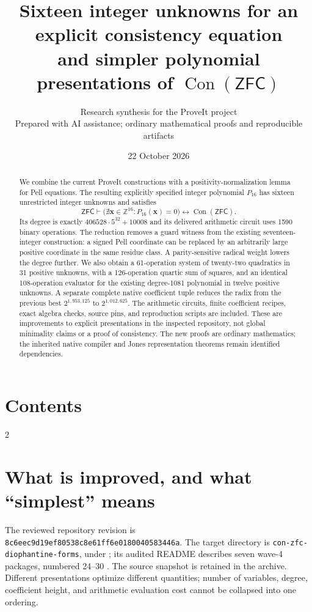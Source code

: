 \documentclass[11pt]{article}
\title{Sixteen integer unknowns for an explicit consistency equation\\[5pt]\large and simpler polynomial presentations of $\operatorname{Con}(\mathsf{ZFC})$}
\author{Research synthesis for the ProveIt project\\\small Prepared with AI assistance; ordinary mathematical proofs and reproducible artifacts}
\date{22 October 2026}
\theoremstyle{remark}\newtheorem{remark}[theorem]{Remark}
\newcommand{\Z}{\mathbb Z}\newcommand{\N}{\mathbb N}
\newcommand{\ZFC}{\mathsf{ZFC}}\newcommand{\Con}{\operatorname{Con}(\ZFC)}
\newcommand{\SignedOps}{1590}
\newcommand{\pin}{\texttt{8c6eec9d19ef80538c8e61ff6e0180040583446a}}
\begin{document}
\maketitle
\begin{abstract}
We combine the current ProveIt constructions with a positivity-normalization
lemma for Pell equations. The resulting explicitly specified integer polynomial
$P_{16}$ has sixteen unrestricted integer unknowns and satisfies
\[
 \ZFC\vdash\bigl(\nexists\mathbf x\in\Z^{16}:P_{16}(\mathbf x)=0\bigr)
 \longleftrightarrow\Con.
\]
Its degree is exactly $406528\cdot5^{32}+10008$ and its delivered arithmetic
circuit uses \SignedOps{} binary operations. The reduction removes a guard
witness from the existing seventeen-integer construction: a signed Pell
coordinate can be replaced by an arbitrarily large positive coordinate in
the same residue class. A parity-sensitive radical weight lowers the degree
further. We also obtain a 61-operation system of twenty-two quadratics in
31 positive unknowns, with a 126-operation quartic sum of squares, and an
identical 108-operation evaluator for the existing degree-1081 polynomial
in twelve positive unknowns. A separate complete native coefficient tuple
reduces the radix from the previous best $2^{1,953,125}$ to $2^{1,012,625}$.
The arithmetic circuits, finite coefficient
recipes, exact algebra checks, source pins, and reproduction scripts are
included. These are improvements to explicit presentations in the inspected
repository, not global minimality claims or a proof of consistency. The new
proofs are ordinary mathematics; the inherited native compiler and Jones
representation theorems remain identified dependencies.
\end{abstract}
\section*{Contents}
\setcounter{tocdepth}{1}
\begin{multicols}{2}\small
\makeatletter{}\makeatother
\end{multicols}
\newpage

\section{What is improved, and what ``simplest'' means}
The reviewed repository revision is \pin. The target directory is
\texttt{con-zfc-diophantine-forms}, under
; its audited
README describes seven wave-4 packages, numbered 24--30 \cite{repo}.
The source snapshot is retained in the archive. Different presentations
optimize different quantities; number of variables, degree, coefficient
height, and arithmetic evaluation cost cannot be collapsed into one ordering.
\end{document}
